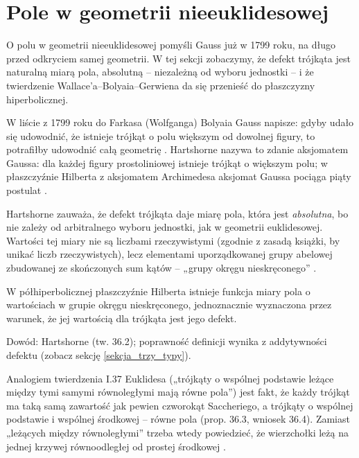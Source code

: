 \section{Pole w geometrii nieeuklidesowej} %
\label{sekcja_pole_hartshorne}
O polu w geometrii nieeuklidesowej pomyśli Gauss już w 1799 roku, na długo przed odkryciem samej geometrii. %
W tej sekcji zobaczymy, że defekt trójkąta jest naturalną miarą pola, absolutną -- niezależną od wyboru jednostki -- i że twierdzenie Wallace'a--Bolyaia--Gerwiena da się przenieść do płaszczyzny hiperbolicznej. %

W liście z 1799 roku do Farkasa (Wolfganga) Bolyaia Gauss napisze: gdyby udało się udowodnić, że istnieje trójkąt o polu większym od dowolnej figury, to potrafiłby udowodnić całą geometrię \cite[s. 332, zad. 36.1]{hartshorne_2000}. %
Hartshorne nazywa to zdanie aksjomatem Gaussa: dla każdej figury prostoliniowej istnieje trójkąt o większym polu; w płaszczyźnie Hilberta z aksjomatem Archimedesa aksjomat Gaussa pociąga piąty postulat \cite[s. 332]{hartshorne_2000}. %
%

Hartshorne \cite[s. 326]{hartshorne_2000} zauważa, że defekt trójkąta daje miarę pola, która jest \emph{absolutna}, bo nie zależy od arbitralnego wyboru jednostki, jak w geometrii euklidesowej. %
Wartości tej miary nie są liczbami rzeczywistymi (zgodnie z zasadą książki, by unikać liczb rzeczywistych), lecz elementami uporządkowanej grupy abelowej zbudowanej ze skończonych sum kątów -- „grupy okręgu nieskręconego'' \cite[s. 326--327]{hartshorne_2000}. %

\begin{theorem}
	W półhiperbolicznej płaszczyźnie Hilberta istnieje funkcja miary pola o wartościach w grupie okręgu nieskręconego, jednoznacznie wyznaczona przez warunek, że jej wartością dla trójkąta jest jego defekt. %
\end{theorem}

Dowód: Hartshorne \cite[s. 328]{hartshorne_2000} (tw. 36.2); poprawność definicji wynika z addytywności defektu (zobacz sekcję \ref{sekcja_trzy_typy}). %

Analogiem twierdzenia I.37 Euklidesa („trójkąty o wspólnej podstawie leżące między tymi samymi równoległymi mają równe pola'') jest fakt, że każdy trójkąt ma taką samą zawartość jak pewien czworokąt Saccheriego, a trójkąty o wspólnej podstawie i wspólnej środkowej -- równe pola \cite[s. 328--329]{hartshorne_2000} (prop. 36.3, wniosek 36.4). %
Zamiast „leżących między równoległymi'' trzeba wtedy powiedzieć, że wierzchołki leżą na jednej krzywej równoodległej od prostej środkowej \cite[s. 329]{hartshorne_2000}. %

